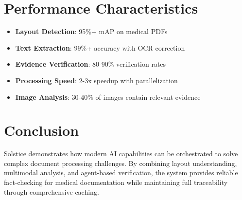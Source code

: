 \documentclass[11pt]{article}
\begin{document}
\section{Performance Characteristics}

\begin{itemize}[leftmargin=*,topsep=0pt,itemsep=0pt]
\item \textbf{Layout Detection}: 95\%+ mAP on medical PDFs
\item \textbf{Text Extraction}: 99\%+ accuracy with OCR correction
\item \textbf{Evidence Verification}: 80-90\% verification rates
\item \textbf{Processing Speed}: 2-3x speedup with parallelization
\item \textbf{Image Analysis}: 30-40\% of images contain relevant evidence
\end{itemize}

\section{Conclusion}

Solstice demonstrates how modern AI capabilities can be orchestrated to solve complex document processing challenges. By combining layout understanding, multimodal analysis, and agent-based verification, the system provides reliable fact-checking for medical documentation while maintaining full traceability through comprehensive caching.
\end{document}
